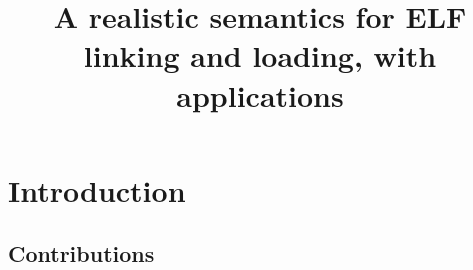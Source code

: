\documentclass[preprint, natbib, 10pt]{sigplanconf-pldi15}
\title{A realistic semantics for ELF linking and loading, with applications}
\begin{document}
\maketitle

\begin{abstract}
\end{abstract}

\section{Introduction}
\label{sect.introduction}

\subsection{Contributions}
\label{subsect.contributions}
\end{document}
